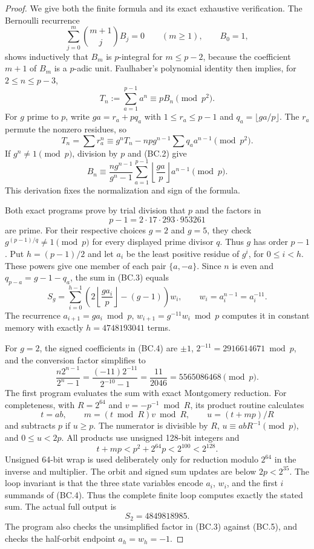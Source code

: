 \documentclass[11pt,a4paper]{article}
\theoremstyle{definition}
\begin{document}
\begin{proof}
We give both the finite formula and its exact exhaustive verification.
The Bernoulli recurrence
\[
 \sum_{j=0}^{m}\binom{m+1}{j}B_j=0\qquad(m\ge1),\qquad B_0=1,
\]
shows inductively that $B_m$ is $p$-integral for $m\le p-2$,
because the coefficient $m+1$ of $B_m$ is a $p$-adic unit.
Faulhaber's polynomial identity then implies, for
$2\le n\le p-3$,
\[
                  T_n:=\sum_{a=1}^{p-1}a^n
                       \equiv pB_n\pmod{p^2}.
 \tag{BC.2}
\]
For $g$ prime to $p$, write $ga=r_a+pq_a$ with
$1\le r_a\le p-1$ and $q_a=\lfloor ga/p\rfloor$.
The $r_a$ permute the nonzero residues, so
\[
 T_n=\sum r_a^n
 \equiv g^nT_n-np g^{n-1}\sum q_a a^{n-1}\pmod{p^2}.
\]
If $g^n\ne1\pmod p$, division by $p$ and (BC.2) give
\[
 B_n\equiv
 \frac{n g^{n-1}}{g^n-1}
 \sum_{a=1}^{p-1}\left\lfloor\frac{ga}{p}\right\rfloor a^{n-1}
 \pmod p.
 \tag{BC.3}
\]
This derivation fixes the normalization and sign of the formula.

Both exact programs prove by trial division that $p$ and the factors in
\[
                     p-1=2\cdot17\cdot293\cdot953261
\]
are prime. For their respective choices $g=2$ and $g=5$, they check
$g^{(p-1)/q}\ne1\pmod p$ for every displayed prime divisor $q$.
Thus $g$ has order $p-1$. Put $h=(p-1)/2$ and let
$a_i$ be the least positive residue of $g^i$, for $0\le i<h$.
These powers give one member of each pair $\{a,-a\}$.
Since $n$ is even and
$q_{p-a}=g-1-q_a$, the sum in (BC.3) equals
\[
 S_g=\sum_{i=0}^{h-1}
       \left(2\left\lfloor\frac{ga_i}{p}\right\rfloor-(g-1)\right)w_i,
 \qquad w_i=a_i^{n-1}=a_i^{-11}.
 \tag{BC.4}
\]
The recurrence
$a_{i+1}=ga_i\bmod p$,
$w_{i+1}=g^{-11}w_i\bmod p$
computes it in constant memory with exactly
$h=4748193041$ terms.

For $g=2$, the signed coefficients in (BC.4) are $\pm1$,
$2^{-11}=2916614671\bmod p$, and the conversion factor simplifies to
\[
 \frac{n2^{n-1}}{2^n-1}
 =\frac{(-11)2^{-11}}{2^{-10}-1}
 =\frac{11}{2046}
 =5565086468\pmod p.
 \tag{BC.5}
\]
The first program evaluates the sum with exact Montgomery reduction.
For completeness, with $R=2^{64}$ and $v=-p^{-1}\bmod R$, its product
routine calculates
\[
 t=ab,\qquad m=(t\bmod R)v\bmod R,\qquad u=(t+mp)/R
\]
and subtracts $p$ if $u\ge p$.
The numerator is divisible by $R$,
$u\equiv abR^{-1}\pmod p$, and $0\le u<2p$.
All products use unsigned 128-bit integers and
\[
                 t+mp<p^2+2^{64}p<2^{100}<2^{128}.
\]
Unsigned 64-bit wrap is used deliberately only for reduction modulo
$2^{64}$ in the inverse and multiplier.
The orbit and signed sum updates are below $2p<2^{35}$.
The loop invariant is that the three state variables encode
$a_i$, $w_i$, and the first $i$ summands of (BC.4).
Thus the complete finite loop computes exactly the stated sum.
The actual full output is
\[
                         S_2=4849818985.
\]
The program also checks the unsimplified factor in (BC.3) against
(BC.5), and checks the half-orbit endpoint $a_h=w_h=-1$.


\end{proof}
\end{document}

